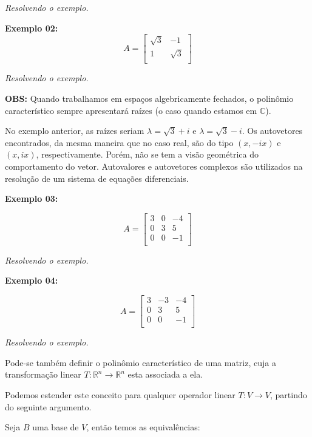 \documentclass[oneside,a4paper,12pt]{article}
\begin{document}
\vspace{50pt}
\emph{Resolvendo o exemplo.}

{\bf Exemplo 02:}
$$A = \left[
\begin{array}{cc}
\sqrt{3}	&	-1 \\
1	&	\sqrt{3} \\
\end{array}
\right]$$

\vspace{50pt}
\emph{Resolvendo o exemplo.}

{\bf OBS:} Quando trabalhamos em espaços algebricamente fechados, o polinômio característico sempre apresentará raízes (o caso quando estamos em $\mathbb{C}$). 

No exemplo anterior, as raízes seriam $\lambda = \sqrt{3} + i$ e $\lambda = \sqrt{3} - i$. Os autovetores encontrados, da mesma maneira que no caso real, são do tipo $(x,-ix)$ e $(x,ix)$, respectivamente. Porém, não se tem a visão geométrica do comportamento do vetor. Autovalores e autovetores complexos são utilizados na resolução de um sistema de equações diferenciais.

{\bf Exemplo 03:}

$$A = \left[
\begin{array}{ccc}
3	&	0	&	-4\\
0	&	3	&	5 \\
0	&	0	&	-1	\\
\end{array}
\right]$$

\vspace{50pt}
\emph{Resolvendo o exemplo.}

{\bf Exemplo 04:}

$$A = \left[
\begin{array}{ccc}
3	&	-3	&	-4\\
0	&	3	&	5 \\
0	&	0	&	-1	\\
\end{array}
\right]$$

\vspace{50pt}
\emph{Resolvendo o exemplo.}

Pode-se também definir o polinômio característico de uma matriz, cuja a transformação linear $T:\mathbb{R}^n \rightarrow \mathbb{R}^n$ esta associada a ela.

Podemos estender este conceito para qualquer operador linear $T:V \rightarrow V$, partindo do seguinte argumento.

Seja $B$ uma base de $V$, então temos as equivalências:
\vspace{80pt}
\end{document}
